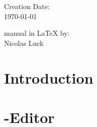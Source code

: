 \vspace*{16.0 cm}
\noindent \Large{Creation Date:}\\
\noindent \Large{\today}\bb

\noindent \Large{\PQUEUE{} manual in \LaTeX{} by: }\\
\noindent \Large{Nicolas Luck}\\
\normalsize


\newpage
\hypertarget{TargetEinsprungspunktHilfe}{}
\tableofcontents
\pagestyle{fancy}
\newpage


\section{Introduction} \hypertarget{TargetIntroduction}{}
\newpage

\newpage

\section{\PJOB} \hypertarget{TargetPJob}{}
\label{section:pjob}
\newpage

\newpage

\section{\PJOBCMD} \hypertarget{TargetPJobCmd}{}
\newpage
\label{section:pjob-cmd}

\newpage

\section{\PJOB-Editor} \hypertarget{TargetPJobEditor}{}
\label{section:pjob-editor}
\newpage

\newpage

\section{\PQUEUE} \hypertarget{TargetPQueue}{}
\label{section:pqueue}
\setcounter{figure}{0}
\newpage

\newpage

\newpage
\begin{appendix}
	
\end{appendix}
\newpage
\footnotesize
\printindex


\newpage
\pagestyle{empty}
\vspace*{5cm}

